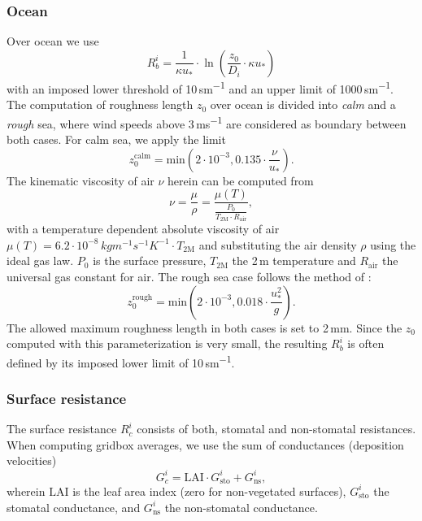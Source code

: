 \documentclass[gmd, manuscript]{copernicus}
\begin{document}
\subsubsection*{Ocean}
Over ocean we use \citep[Eq.~(54),][]{ACP:Simpson2012}
\begin{equation}
  R_b^i = \frac{1}{\kappa u_*}\cdot\ln\left({\frac{z_0}{D_i}\cdot \kappa u_*}\right)
\end{equation}
with an imposed lower threshold of 10\,\unit{sm^{-1}} and an upper limit of 1000\,\unit{sm^{-1}}. The computation of roughness length $z_0$ over ocean is divided into \emph{calm} and a \emph{rough} sea, where wind speeds above 3\,\unit{ms^{-1}} are considered as boundary between both cases. For calm sea, we apply the limit \citep[][with a slightly higher coefficient of $0.135$]{Hinze1975,Garratt1992}
\begin{equation}
  z_0^\text{calm} = \text{min}\left(2\cdot10^{-3}, 0.135 \cdot \frac{\nu}{u_*}\right).
\end{equation}
The kinematic viscosity of air $\nu$ herein can be computed from 
\begin{equation}
  \nu = \frac{\mu}{\rho} = \frac{\mu(T)}{\frac{P_0}{T_\text{2M}\cdot R_\text{air}}},
\end{equation}
with a temperature dependent absolute viscosity of air $\mu(T) = 6.2\cdot 10^{-8}\,\unit{kg m^{-1} s^{-1} K^{-1}} \cdot T_\text{2M}$ and substituting the air density $\rho$ using the ideal gas law. $P_0$ is the surface pressure, $T_\text{2M}$ the 2\,\unit{m} temperature and $R_\text{air}$ the universal gas constant for air.
The rough sea case follows the method of \citet{QJRMS:Charnock1955,JPO:Wu1980}:
\begin{equation}
  z_0^\text{rough} = \text{min}\left(2\cdot10^{-3}, 0.018 \cdot \frac{u^2_*}{g}\right).
\end{equation}
The allowed maximum roughness length in both cases is set to 2\,\unit{mm}. Since the $z_0$ computed with this parameterization is very small, the resulting $R^i_b$ is often defined by its imposed lower limit of 10\,\unit{sm^{-1}}.
\subsubsection{Surface resistance}
\label{subsubsec:Rc}
The surface resistance $R_c^i$ consists of both, stomatal and non-stomatal resistances. When computing gridbox averages, we use the sum of conductances (deposition velocities)
\begin{equation}
  G_c^i = \text{LAI} \cdot G_\text{sto}^i + G_\text{ns}^i, 
\end{equation}
wherein $\text{LAI}$ is the leaf area index (zero for non-vegetated surfaces), $G_\text{sto}^i$ the stomatal conductance, and $G_\text{ns}^i$ the non-stomatal conductance.
\end{document}
